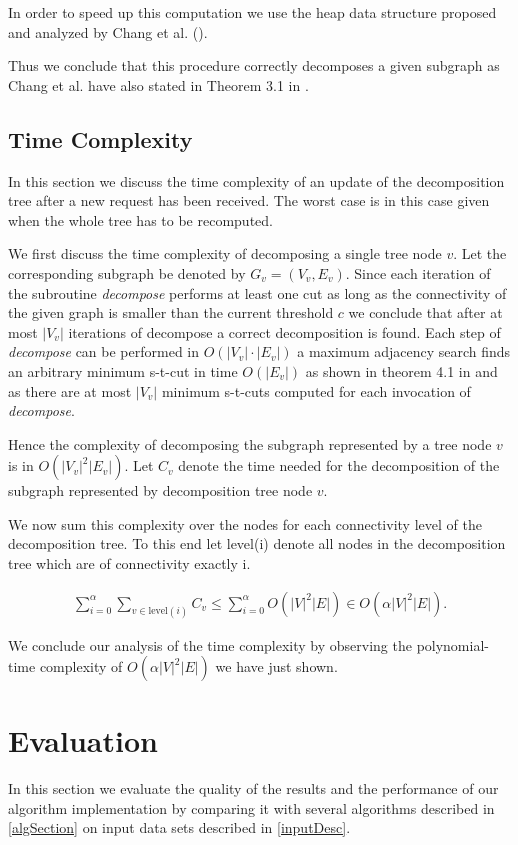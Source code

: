 \documentclass[a4paper,xcolor=dvipsnames, tikz, 12pt]{article}
\theoremstyle{definition}
\begin{document}
In order to speed up this computation we use the heap data structure proposed and analyzed by Chang et al. (\cite{Chang2013}).

Thus we conclude that this procedure correctly decomposes a given subgraph as Chang et al. have also stated in Theorem 3.1 in \cite{Chang2013}.


\subsection{Time Complexity}
In this section we discuss the time complexity of an update of the decomposition tree after a new request has been received. The worst case is in this case given when the whole tree has to be recomputed.

We first discuss the time complexity of decomposing a single tree node $v$. Let the corresponding subgraph be denoted by $G_v=(V_v, E_v)$.
Since each iteration of the subroutine \textit{decompose} performs at least one cut as long as the connectivity of the given graph is smaller than the current threshold $c$ we conclude that after at most $|V_v|$ iterations of decompose a correct decomposition is found. Each step of \textit{decompose } can be performed in $O(|V_v|\cdot|E_v|)$ a maximum adjacency search finds an arbitrary minimum s-t-cut in time $O(|E_v|)$ as shown in theorem 4.1 in \cite{Chang2013} and as there are at most $|V_v|$ minimum s-t-cuts computed for each invocation of \textit{decompose}.

Hence the complexity of decomposing the subgraph represented by a tree node $v$ is in $O(|V_v|^2|E_v|)$. Let $C_v$ denote the time needed for the decomposition of the subgraph represented  by decomposition tree node $v$.

We now sum this complexity over the nodes for each connectivity level of the decomposition tree. To this end let level(i) denote all nodes in the decomposition tree which are of connectivity exactly i.

\begin{align*}
	\sum_{i=0}^{\alpha}\sum_{v\in \text{level}(i)}C_v\leq\sum_{i=0}^{\alpha}O(|V|^2|E|)\in O(\alpha|V|^2|E|).
\end{align*}

We conclude our analysis of the time complexity by observing the polynomial-time complexity of $O(\alpha|V|^2|E|)$ we have just shown.


\section{Evaluation}
In this section we evaluate the quality of the results and the performance of our algorithm implementation by comparing it with several algorithms described in \cref{algSection} on input data sets described in \cref{inputDesc}.
\end{document}
